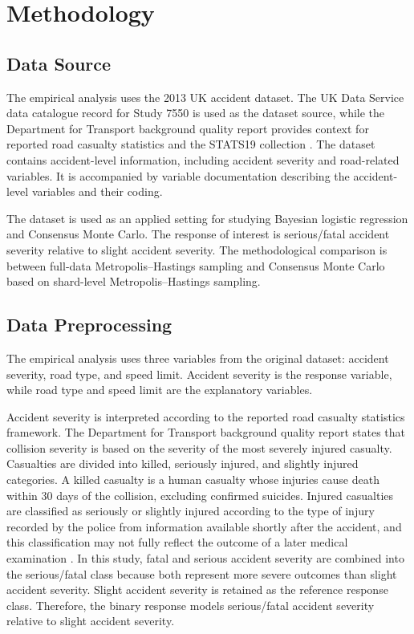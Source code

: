 \chapter{Methodology}

\section{Data Source}

The empirical analysis uses the 2013 UK accident dataset. The UK Data Service data catalogue record for Study 7550 is used as the dataset source, while the Department for Transport background quality report provides context for reported road casualty statistics and the STATS19 collection \cite{ukdataservice7550,dft2025quality}. The dataset contains accident-level information, including accident severity and road-related variables. It is accompanied by variable documentation describing the accident-level variables and their coding.

The dataset is used as an applied setting for studying Bayesian logistic regression and Consensus Monte Carlo. The response of interest is serious/fatal accident severity relative to slight accident severity. The methodological comparison is between full-data Metropolis--Hastings sampling and Consensus Monte Carlo based on shard-level Metropolis--Hastings sampling.

\section{Data Preprocessing}

The empirical analysis uses three variables from the original dataset: accident severity, road type, and speed limit. Accident severity is the response variable, while road type and speed limit are the explanatory variables.

Accident severity is interpreted according to the reported road casualty statistics framework. The Department for Transport background quality report states that collision severity is based on the severity of the most severely injured casualty. Casualties are divided into killed, seriously injured, and slightly injured categories. A killed casualty is a human casualty whose injuries cause death within 30 days of the collision, excluding confirmed suicides. Injured casualties are classified as seriously or slightly injured according to the type of injury recorded by the police from information available shortly after the accident, and this classification may not fully reflect the outcome of a later medical examination \cite{dft2025quality}. In this study, fatal and serious accident severity are combined into the serious/fatal class because both represent more severe outcomes than slight accident severity. Slight accident severity is retained as the reference response class. Therefore, the binary response models serious/fatal accident severity relative to slight accident severity.

